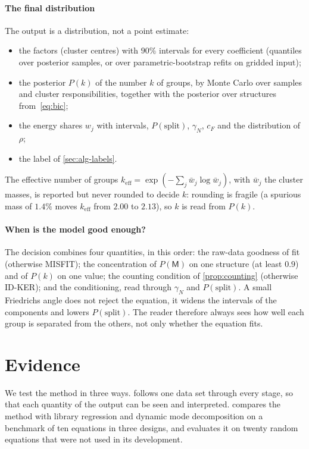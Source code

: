 \documentclass[11pt]{article}
\theoremstyle{plain}
\theoremstyle{definition}
\theoremstyle{remark}
\newcommand{\cF}{c_{F}}                     %
\newcommand{\gN}{\gamma_{N}}                %
\newcommand{\keff}{k_{\mathrm{eff}}}        %
\newcommand{\Mfit}{\mathsf{M}}              %
\newcommand{\lab}[1]{\textsf{#1}}           %
\newcommand{\IDK}{\lab{ID-KER}}
\newcommand{\MIS}{\lab{MISFIT}}
\begin{document}
\paragraph{The final distribution}
The output is a distribution, not a point estimate:
\begin{itemize}
  \item the factors (cluster centres) with $90\%$ intervals for every coefficient (quantiles over posterior samples, or over
  parametric-bootstrap refits on gridded input);
  \item the posterior $P(k)$ of the number $k$ of groups, by Monte Carlo over samples and cluster
  responsibilities, together with the posterior over structures from~\eqref{eq:bic};
  \item the energy shares $w_j$ with intervals, $P(\text{split})$, $\gN$, $\cF$ and the distribution of $\rho$;
  \item the label of \cref{sec:alg-labels}.
\end{itemize}
The effective number of groups $\keff=\exp(-\sum_j\bar w_j\log\bar w_j)$, with $\bar w_j$ the cluster masses, is reported
but never rounded to decide $k$: rounding is fragile (a spurious mass of $1.4\%$ moves $\keff$ from $2.00$ to
$2.13$), so $k$ is read from $P(k)$.

\paragraph{When is the model good enough?}
The decision combines four quantities, in this order: the raw-data goodness of fit (otherwise \MIS); the
concentration of $P(\Mfit)$ on one structure (at least $0.9$) and of $P(k)$ on one value; the counting
condition of \cref{prop:counting} (otherwise \IDK); and the conditioning, read through $\gN$ and
$P(\text{split})$. A small Friedrichs angle does not reject the equation, it widens the intervals of the
components and lowers $P(\text{split})$. The reader therefore always sees how well each group is
separated from the others, not only whether the equation fits.



\section{Evidence}\label{sec:evidence}
\label{sec:results}
We test the method in three ways.  follows one data set through every stage, so that each quantity of
the output can be seen and interpreted.  compares the method with library regression and dynamic mode
decomposition on a benchmark of ten equations in three designs, and evaluates it on twenty random equations that were
not used in its development.
\end{document}
